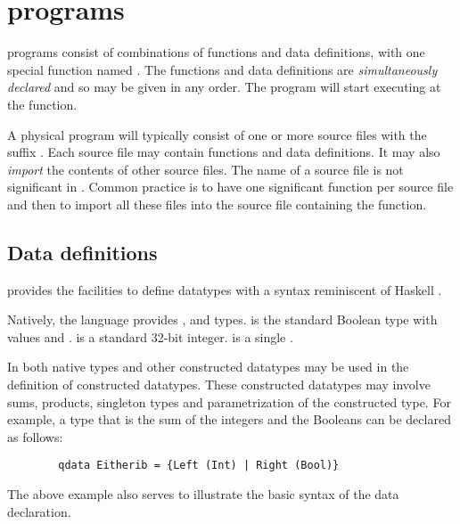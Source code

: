 \section{\lqpl{} programs}\label{sec:lqplprograms}
\lqpl{} programs  
consist of combinations of functions and data definitions, with 
one special function named . 
The functions and data definitions are
\emph{simultaneously declared} and  so may be 
given in any order. The program will start executing at the 
 function. 

A physical program will typically consist of one or more source files
with the suffix . Each source file may contain
functions and data definitions. It  may also
 \emph{import} the contents of other 
source files. The name of a source file is not significant in \lqpl. 
Common practice is to have one significant function per source file
and then to import all these files into the source file containing
the  function.

\subsection{Data definitions}\label{subsec:datadefinitions}
\lqpl{} provides the facilities to define  datatypes with 
a syntax reminiscent of Haskell \cite{peyton2003:haskell98}. 

Natively, the language provides , 
 and  
types.  is the standard Boolean  type with values
 and .  is a standard 32-bit
integer.  is a single \qbit{}.

In \lqpl{} both native types and other constructed datatypes may
be used in the definition of
constructed datatypes. These constructed datatypes may involve
 sums, products,
singleton types and parametrization of the constructed type.
For example, a type that is the sum of the integers and the Booleans
can be declared as  follows:
\begin{lstlisting}
        qdata Eitherib = {Left (Int) | Right (Bool)}
\end{lstlisting}
The above example also serves to illustrate the basic syntax of the 
data declaration. 
